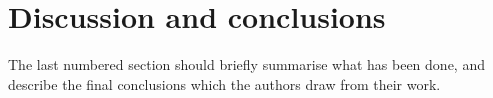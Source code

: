 \section{Discussion and conclusions}
\label{sec:discussion}
The last numbered section should briefly summarise what has been done, and describe the final conclusions which the authors draw from their work.